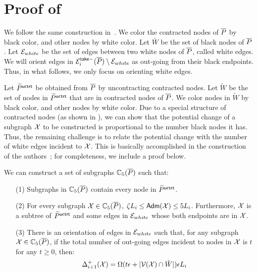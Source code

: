 
\section{Proof of }\label{app:Clustering-5BProofE}


We follow the same construction in~\cite{LS19}.  We color the contracted nodes of  $\overline{P}$ by black color, and other nodes by white color. Let $\bar{W}$ be the set of black nodes of $\overline{P}$. Let $\mathcal{E}_{white}$ be the set of edges between two white nodes of $\overline{P}$, called white edges. We will orient edges in $\mathcal{E}_i^{\mathsf{take} -}(\overline{P})\setminus  \mathcal{E}_{white}$ as out-going from their black endpoints. Thus, in what follows, we only focus on  orienting white edges. 


Let $\widetilde{P}^{\mathsf{uctrt}}$ be obtained from $\overline{P}$ by uncontracting contracted nodes. Let $\tilde{W}$ be the set of nodes in $\widetilde{P}^{\mathsf{uctrt}}$ that are in contracted nodes of $\overline{P}$. We color nodes in $\tilde{W}$ by black color, and other nodes by white color.  Due to a special structure of contracted nodes (as shown in ), we can show that the potential change of a subgraph $\mathcal{X}$ to be constructed is proportional to the number black nodes it has. Thus, the remaining challenge is to relate the potential change with the number of white edges incident to $\mathcal{X}$. This is basically accomplished in the construction of the authors~\cite{LS19}; for completeness, we include a proof below.


\begin{lemma}\label{lm:Clustering-White} We can construct a set of subgraphs $\mathbb{C}_5(\overline{P})$ such that: 	
	\begin{enumerate}
		\item[(1)]  Subgraphs in $\mathbb{C}_5(\overline{P})$ contain every node in $\widetilde{P}^{\mathsf{uctrt}}$.
		\item[(2)] For every subgraph $\mathcal{X}\in \mathbb{C}_5(\overline{P})$, $\zeta L_i \leq \mathsf{Adm}(\mathcal{X})\leq 5L_i$. Furthermore, $\mathcal{X}$ is a subtree of $\widetilde{P}^{\mathsf{uctrt}}$ and some edges in  $\mathcal{E}_{white}$  whose both endpoints are in $\mathcal{X}$.
		\item[(3)]  There is an orientation of edges in $\mathcal{E}_{white}$  
		such that, for any subgraph $\mathcal{X} \in  \mathbb{C}_5(\overline{P})$,  if the total number of out-going edges incident to nodes in $\mathcal{X}$ is $t$ for any $t\geq 0$, then:
		\begin{equation}\label{eq:Step5BpotentialWhite}
			\Delta^+_{i+1}(\mathcal{X}) =  \Omega(t\epsilon + |\mathcal{V}(\mathcal{X})\cap \tilde{W}|)\epsilon L_i
		\end{equation}
	\end{enumerate}
\end{lemma}

